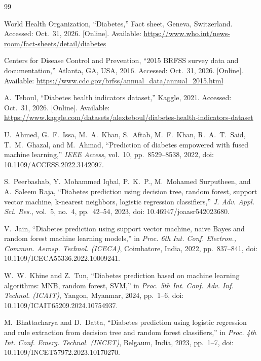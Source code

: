 \documentclass[conference]{IEEEtran}
\begin{document}

\begin{thebibliography}{99}

World Health Organization, ``Diabetes,'' Fact sheet, Geneva, Switzerland. Accessed: Oct.~31, 2026. [Online]. Available: \url{https://www.who.int/news-room/fact-sheets/detail/diabetes}

Centers for Disease Control and Prevention, ``2015 BRFSS survey data and documentation,'' Atlanta, GA, USA, 2016. Accessed: Oct.~31, 2026. [Online]. Available: \url{https://www.cdc.gov/brfss/annual_data/annual_2015.html}

A.~Teboul, ``Diabetes health indicators dataset,'' Kaggle, 2021. Accessed: Oct.~31, 2026. [Online]. Available: \url{https://www.kaggle.com/datasets/alexteboul/diabetes-health-indicators-dataset}

U.~Ahmed, G.~F.~Issa, M.~A.~Khan, S.~Aftab, M.~F.~Khan, R.~A.~T.~Said, T.~M.~Ghazal, and M.~Ahmad, ``Prediction of diabetes empowered with fused machine learning,'' \textit{IEEE Access}, vol.~10, pp.~8529--8538, 2022, doi: 10.1109/ACCESS.2022.3142097.

S.~Peerbashab, Y.~Mohammed Iqbal, P.~K.~P., M.~Mohamed Surputheen, and A.~Saleem Raja, ``Diabetes prediction using decision tree, random forest, support vector machine, k-nearest neighbors, logistic regression classifiers,'' \textit{J. Adv. Appl. Sci. Res.}, vol.~5, no.~4, pp.~42--54, 2023, doi: 10.46947/joaasr542023680.

V.~Jain, ``Diabetes prediction using support vector machine, naive Bayes and random forest machine learning models,'' in \textit{Proc. 6th Int. Conf. Electron., Commun. Aerosp. Technol. (ICECA)}, Coimbatore, India, 2022, pp.~837--841, doi: 10.1109/ICECA55336.2022.10009241.

W.~W.~Khine and Z.~Tun, ``Diabetes prediction based on machine learning algorithms: MNB, random forest, SVM,'' in \textit{Proc. 5th Int. Conf. Adv. Inf. Technol. (ICAIT)}, Yangon, Myanmar, 2024, pp.~1--6, doi: 10.1109/ICAIT65209.2024.10754937.

M.~Bhattacharya and D.~Datta, ``Diabetes prediction using logistic regression and rule extraction from decision tree and random forest classifiers,'' in \textit{Proc. 4th Int. Conf. Emerg. Technol. (INCET)}, Belgaum, India, 2023, pp.~1--7, doi: 10.1109/INCET57972.2023.10170270.


\end{thebibliography}
\end{document}
